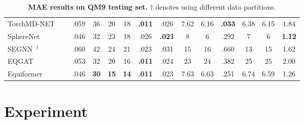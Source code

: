 \begin{table}[t]
\begin{adjustwidth}{0cm}{0cm}
{\begin{tabular}{llcccccccccccc}
TorchMD-NET~\citep{torchmd_net} & & .059 & 36 & 20 & 18 & \textbf{.011} & .026 & 7.62 & 6.16 & \textbf{.033} & 6.38 & 6.15 & 1.84 \\

SphereNet~\citep{spherenet} & & .046 & 32 & 23 & 18 & .026 & \textbf{.021} & 8 & 6 & .292 & 7 & 6 & \textbf{1.12} \\

SEGNN~\citep{segnn}$^{\dagger}$ & & .060 & 42 & 24 & 21 & .023 & .031 & 15 & 16 & .660 & 13 & 15 & 1.62 \\

EQGAT~\citep{eqgat} & & .053 & 32 & 20 & 16 & \textbf{.011} & .024 & 23 & 24 & .382 & 25 & 25 & 2.00 \\
\midrule[0.6pt]

Equiformer & & .046 & \textbf{30} & \textbf{15} & \textbf{14} & \textbf{.011} & .023 & 7.63 & 6.63 & .251 & 6.74 & 6.59 & 1.26 \\
\bottomrule[1.2pt]

\end{tabular}
}
\vspace{-3mm}
\end{adjustwidth}
\caption{\textbf{MAE results on QM9 testing set.}  
$\dagger$ denotes using different data partitions.
}
\vspace{-3mm}
\label{tab:qm9_result}
\end{table}


\vspace{-2.5mm}
\section{Experiment}
\vspace{-3mm}

